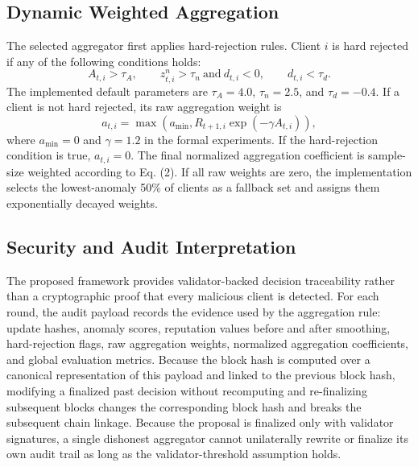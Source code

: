 \documentclass[preprint,12pt]{elsarticle}
\begin{document}
\subsection{Dynamic Weighted Aggregation}

The selected aggregator first applies hard-rejection rules. Client $i$ is hard rejected if any of the following conditions holds:
\begin{equation}
A_{t,i}>\tau_A,\qquad
z^n_{t,i}>\tau_n \ \mathrm{and}\ d_{t,i}<0,\qquad
d_{t,i}<\tau_d.
\end{equation}
The implemented default parameters are $\tau_A=4.0$, $\tau_n=2.5$, and $\tau_d=-0.4$. If a client is not hard rejected, its raw aggregation weight is
\begin{equation}
a_{t,i}=\max(a_{\min},R_{t+1,i}\exp(-\gamma A_{t,i})),
\end{equation}
where $a_{\min}=0$ and $\gamma=1.2$ in the formal experiments. If the hard-rejection condition is true, $a_{t,i}=0$. The final normalized aggregation coefficient is sample-size weighted according to Eq. (2). If all raw weights are zero, the implementation selects the lowest-anomaly 50\% of clients as a fallback set and assigns them exponentially decayed weights.

\subsection{Security and Audit Interpretation}

The proposed framework provides validator-backed decision traceability rather than a cryptographic proof that every malicious client is detected. For each round, the audit payload records the evidence used by the aggregation rule: update hashes, anomaly scores, reputation values before and after smoothing, hard-rejection flags, raw aggregation weights, normalized aggregation coefficients, and global evaluation metrics. Because the block hash is computed over a canonical representation of this payload and linked to the previous block hash, modifying a finalized past decision without recomputing and re-finalizing subsequent blocks changes the corresponding block hash and breaks the subsequent chain linkage. Because the proposal is finalized only with validator signatures, a single dishonest aggregator cannot unilaterally rewrite or finalize its own audit trail as long as the validator-threshold assumption holds.
\end{document}
